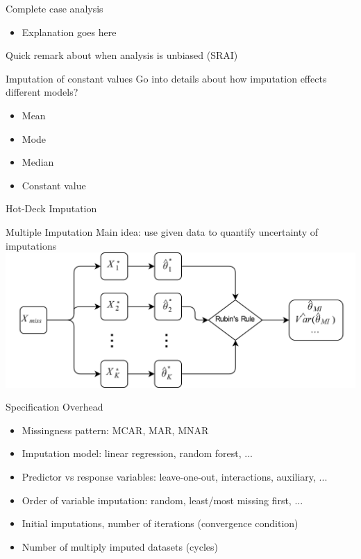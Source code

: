 \documentclass[aspectratio=43]{beamer}
\begin{document}
\begin{frame}{Complete case analysis}
\begin{itemize}
\item Explanation goes here
\end{itemize}
Quick remark about when analysis is unbiased (SRAI)
\end{frame}

\begin{frame}{Imputation of constant values}
Go into details about how imputation effects different models?
\begin{itemize}
\item Mean
\item Mode
\item Median
\item Constant value
\end{itemize}
\end{frame}

\begin{frame}{Hot-Deck Imputation}
\end{frame}


\begin{frame}{Multiple Imputation}
Main idea: use given data to quantify uncertainty of imputations
\phantom{This text will be invisible} \\
\centering
\includegraphics[width=0.9\paperwidth]{MI}
\end{frame}

\begin{frame}{Specification Overhead}
\begin{itemize}
\item Missingness pattern: MCAR, MAR, MNAR
\item Imputation model: linear regression, random forest, ...
\item Predictor vs response variables: leave-one-out, interactions, auxiliary, ...
\item Order of variable imputation: random, least/most missing first, ...
\item Initial imputations, number of iterations (convergence condition)
\item Number of multiply imputed datasets (cycles)
\end{itemize}
\end{frame}
\end{document}
